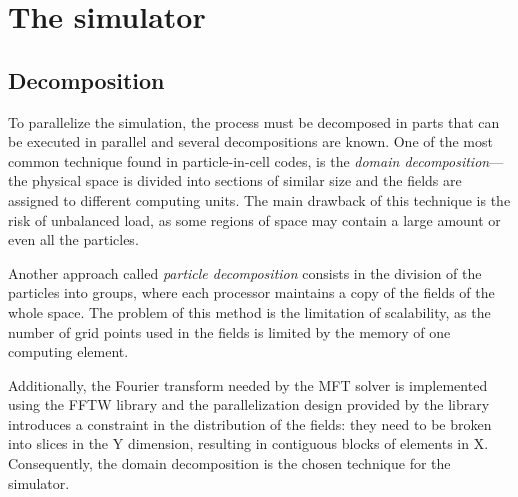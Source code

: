\chapter{The simulator}
\label{ch:parallel-simulator}

\section{Decomposition}

To parallelize the simulation, the process must be decomposed in parts that can 
be executed in parallel and several decompositions are known.
%
One of the most common technique found in particle-in-cell codes, is the 
\textit{domain decomposition}---the physical space is divided into sections of 
similar size and the fields are assigned to different computing units. The main 
drawback of this technique is the risk of unbalanced load, as some regions of 
space may contain a large amount or even all the particles.

Another approach called \textit{particle decomposition} consists in the division 
of the particles into groups, where each processor maintains a copy of the 
fields of the whole space.  The problem of this method is the limitation of 
scalability, as the number of grid points used in the fields is limited by the 
memory of one computing element.

Additionally, the Fourier transform needed by the MFT solver is implemented 
using the FFTW library and the parallelization design provided by the library 
introduces a constraint in the distribution of the fields: they need to be 
broken into slices in the Y dimension, resulting in contiguous blocks of 
elements in X. Consequently, the domain decomposition is the chosen technique 
for the simulator.

